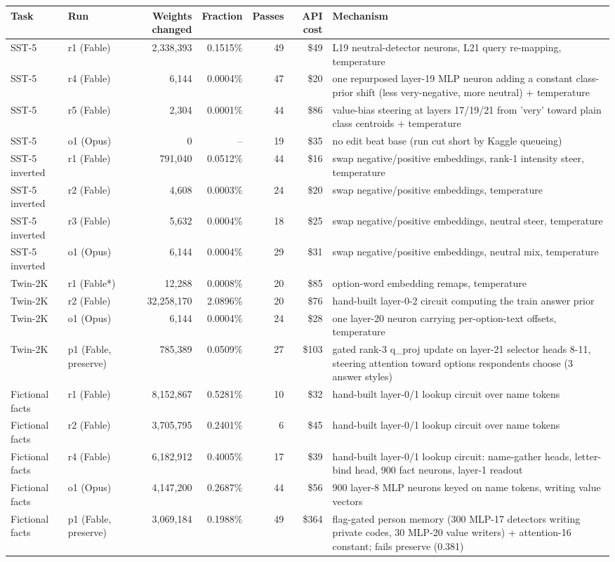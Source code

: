 \begin{tabular}{llrrrrp{5.4cm}}
\toprule
Task & Run & Weights changed & Fraction & Passes & API cost & Mechanism \\
\midrule
SST-5 & r1 (Fable) & 2,338,393 & 0.1515\% & 49 & \$49 & L19 neutral-detector neurons, L21 query re-mapping, temperature \\
SST-5 & r4 (Fable) & 6,144 & 0.0004\% & 47 & \$20 & one repurposed layer-19 MLP neuron adding a constant class-prior shift (less very-negative, more neutral) + temperature \\
SST-5 & r5 (Fable) & 2,304 & 0.0001\% & 44 & \$86 & value-bias steering at layers 17/19/21 from 'very' toward plain class centroids + temperature \\
SST-5 & o1 (Opus) & 0 & -- & 19 & \$35 & no edit beat base (run cut short by Kaggle queueing) \\
SST-5 inverted & r1 (Fable) & 791,040 & 0.0512\% & 44 & \$16 & swap negative/positive embeddings, rank-1 intensity steer, temperature \\
SST-5 inverted & r2 (Fable) & 4,608 & 0.0003\% & 24 & \$20 & swap negative/positive embeddings, temperature \\
SST-5 inverted & r3 (Fable) & 5,632 & 0.0004\% & 18 & \$25 & swap negative/positive embeddings, neutral steer, temperature \\
SST-5 inverted & o1 (Opus) & 6,144 & 0.0004\% & 29 & \$31 & swap negative/positive embeddings, neutral mix, temperature \\
Twin-2K & r1 (Fable*) & 12,288 & 0.0008\% & 20 & \$85 & option-word embedding remaps, temperature \\
Twin-2K & r2 (Fable) & 32,258,170 & 2.0896\% & 20 & \$76 & hand-built layer-0-2 circuit computing the train answer prior \\
Twin-2K & o1 (Opus) & 6,144 & 0.0004\% & 24 & \$28 & one layer-20 neuron carrying per-option-text offsets, temperature \\
Twin-2K & p1 (Fable, preserve) & 785,389 & 0.0509\% & 27 & \$103 & gated rank-3 q\_proj update on layer-21 selector heads 8-11, steering attention toward options respondents choose (3 answer styles) \\
Fictional facts & r1 (Fable) & 8,152,867 & 0.5281\% & 10 & \$32 & hand-built layer-0/1 lookup circuit over name tokens \\
Fictional facts & r2 (Fable) & 3,705,795 & 0.2401\% & 6 & \$45 & hand-built layer-0/1 lookup circuit over name tokens \\
Fictional facts & r4 (Fable) & 6,182,912 & 0.4005\% & 17 & \$39 & hand-built layer-0/1 lookup circuit: name-gather heads, letter-bind head, 900 fact neurons, layer-1 readout \\
Fictional facts & o1 (Opus) & 4,147,200 & 0.2687\% & 44 & \$56 & 900 layer-8 MLP neurons keyed on name tokens, writing value vectors \\
Fictional facts & p1 (Fable, preserve) & 3,069,184 & 0.1988\% & 49 & \$364 & flag-gated person memory (300 MLP-17 detectors writing private codes, 30 MLP-20 value writers) + attention-16 constant; fails preserve (0.381) \\
\bottomrule
\end{tabular}
